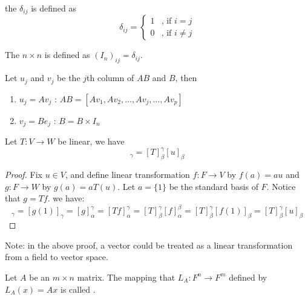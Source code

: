 \begin{definition}
	the   $\delta_{ij}$ is defined as 
	\begin{equation}
		\delta_{ij} = \begin{cases}
			1 & \text{, if } i = j \\
			0 & \text{, if } i \neq j
 		\end{cases}
	\end{equation}
\end{definition}

\begin{definition}
	The $n\times n$   is defined as $(I_n)_{ij} = \delta_{ij}$.
\end{definition}

\begin{theorem}
	Let $u_j$ and $v_j$ be the $j$th column of $AB$ and $B$, then
	\begin{enumerate}
		\item $u_j = A v_j$ : $AB = [A v_1, A v_2, \dots, A v_j, \dots, A v_p]$
		\item $v_j = B e_j$ : $B = B \times I_n$
	\end{enumerate}
\end{theorem}

\begin{theorem} Let $T:V \rightarrow W$ be linear, we have
	\begin{equation}
		[T(u)]_\gamma = [T]_\beta^\gamma [u]_\beta
	\end{equation}
\end{theorem}

\begin{proof}
	Fix $u \in V$, and define linear transformation $f: F \rightarrow V$ by $f(a) = a u$ and $g: F \rightarrow W$ by $g(a) = a T(u)$. Let $a=\{1\}$ be the standard basis of $F$. Notice that $g=Tf$. we have:
	\begin{equation}
		[T(u)]_\gamma = [g(1)]_\gamma = [g]_\alpha^\gamma = [Tf]_\alpha^\gamma = [T]_\beta^\gamma [f]_\alpha^\beta = [T]_\beta^\gamma [f(1)]_\beta = [T]_\beta^\gamma [u]_\beta
	\end{equation}
\end{proof}

Note: in the above proof, a vector could be treated as a linear transformation from a field to vector space.

\begin{definition}
	Let $A$ be an $m \times n$ matrix. The mapping  that $L_A: F^n \rightarrow F^m$ defined by $L_A (x) = A x$ is called  .
\end{definition}

